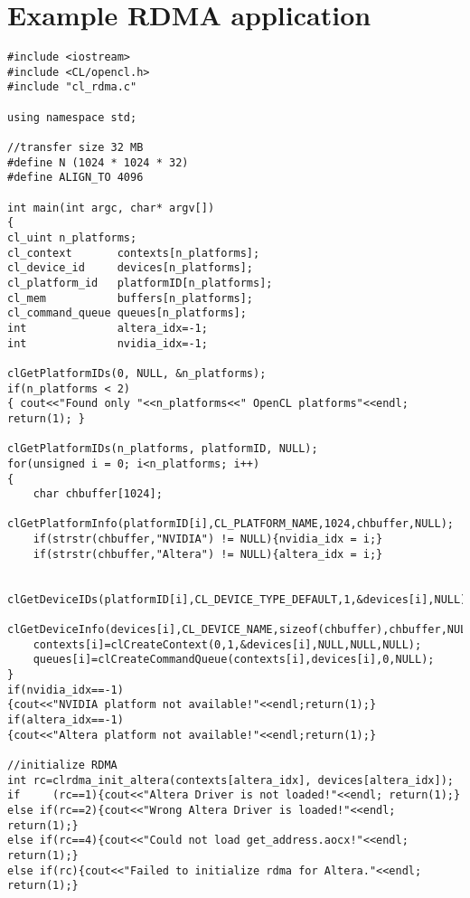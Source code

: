 \chapter{Example RDMA application}


\label{chapter:appendixA}


\begin{lstlisting}[label=listing:appendixA, caption={}, morekeywords={clrdma_init_altera, clrdma_init_nvidia, clrdma_create_pinnable_buffer_nvidia, clrdma_get_buffer_address_altera, clrdma_get_buffer_address_nvidia, read_rdma, cl_rdma}]
#include <iostream>
#include <CL/opencl.h>
#include "cl_rdma.c"

using namespace std;

//transfer size 32 MB
#define N (1024 * 1024 * 32)
#define ALIGN_TO 4096

int main(int argc, char* argv[])
{
cl_uint n_platforms;
cl_context       contexts[n_platforms];
cl_device_id     devices[n_platforms];
cl_platform_id   platformID[n_platforms];
cl_mem           buffers[n_platforms];
cl_command_queue queues[n_platforms];
int              altera_idx=-1;
int              nvidia_idx=-1;

clGetPlatformIDs(0, NULL, &n_platforms);
if(n_platforms < 2)
{ cout<<"Found only "<<n_platforms<<" OpenCL platforms"<<endl; return(1); }

clGetPlatformIDs(n_platforms, platformID, NULL);
for(unsigned i = 0; i<n_platforms; i++)
{
	char chbuffer[1024];
	clGetPlatformInfo(platformID[i],CL_PLATFORM_NAME,1024,chbuffer,NULL);
	if(strstr(chbuffer,"NVIDIA") != NULL){nvidia_idx = i;}
	if(strstr(chbuffer,"Altera") != NULL){altera_idx = i;}
	
	clGetDeviceIDs(platformID[i],CL_DEVICE_TYPE_DEFAULT,1,&devices[i],NULL);
	clGetDeviceInfo(devices[i],CL_DEVICE_NAME,sizeof(chbuffer),chbuffer,NULL);
	contexts[i]=clCreateContext(0,1,&devices[i],NULL,NULL,NULL);
	queues[i]=clCreateCommandQueue(contexts[i],devices[i],0,NULL);
}
if(nvidia_idx==-1)
{cout<<"NVIDIA platform not available!"<<endl;return(1);}
if(altera_idx==-1)
{cout<<"Altera platform not available!"<<endl;return(1);}

//initialize RDMA
int rc=clrdma_init_altera(contexts[altera_idx], devices[altera_idx]);
if     (rc==1){cout<<"Altera Driver is not loaded!"<<endl; return(1);}
else if(rc==2){cout<<"Wrong Altera Driver is loaded!"<<endl; return(1);}
else if(rc==4){cout<<"Could not load get_address.aocx!"<<endl; return(1);}
else if(rc){cout<<"Failed to initialize rdma for Altera."<<endl; return(1);}


\end{lstlisting}
